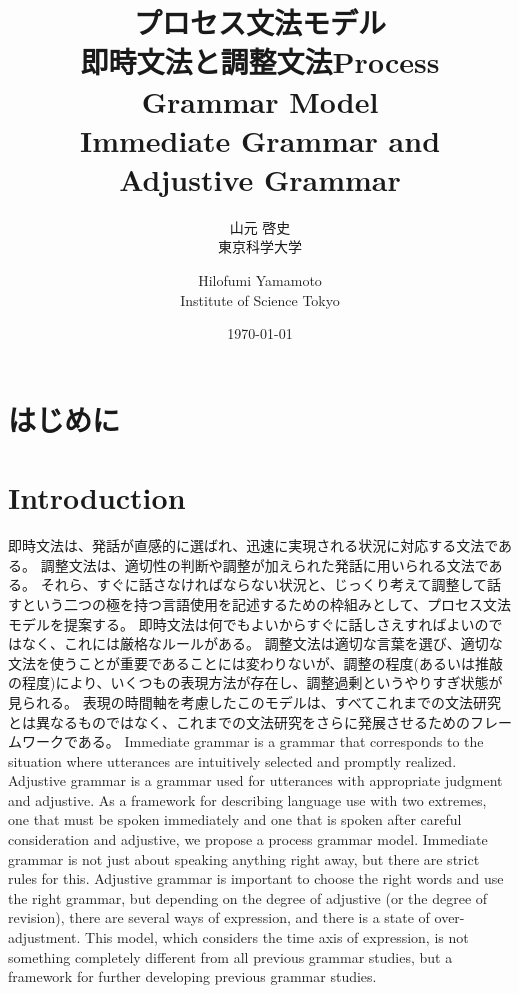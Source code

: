 \documentclass[a4paper]{article}
\title{プロセス文法モデル\\即時文法と調整文法}
\author{
  山元 啓史\\東京科学大学
}
\title{Process Grammar Model\\Immediate Grammar and Adjustive Grammar}
\author{
Hilofumi Yamamoto\\Institute of Science Tokyo
}
\date{\today}
\begin{document}
\maketitle

\setcounter{tocdepth}{2}
\tableofcontents
\clearpage



\ifJPN
\section{はじめに}
\else
\section{Introduction}
\fi

\ifJPN
即時文法は、発話が直感的に選ばれ、迅速に実現される状況に対応する文法である。
調整文法は、適切性の判断や調整が加えられた発話に用いられる文法である。
それら、すぐに話さなければならない状況と、じっくり考えて調整して話すという二つの極を持つ言語使用を記述するための枠組みとして、プロセス文法モデルを提案する。
即時文法は何でもよいからすぐに話しさえすればよいのではなく、これには厳格なルールがある。
調整文法は適切な言葉を選び、適切な文法を使うことが重要であることには変わりないが、調整の程度(あるいは推敲の程度)により、いくつもの表現方法が存在し、調整過剰というやりすぎ状態が見られる。
表現の時間軸を考慮したこのモデルは、すべてこれまでの文法研究とは異なるものではなく、これまでの文法研究をさらに発展させるためのフレームワークである。
\else
Immediate grammar is a grammar that corresponds to the situation where utterances are intuitively selected and promptly realized.
Adjustive grammar is a grammar used for utterances with appropriate judgment and adjustive.
As a framework for describing language use with two extremes, one that must be spoken immediately and one that is spoken after careful consideration and adjustive, we propose a process grammar model.
Immediate grammar is not just about speaking anything right away, but there are strict rules for this.
Adjustive grammar is important to choose the right words and use the right grammar, but depending on the degree of adjustive (or the degree of revision), there are several ways of expression, and there is a state of over-adjustment.
This model, which considers the time axis of expression, is not something completely different from all previous grammar studies, but a framework for further developing previous grammar studies.
\fi
\end{document}
